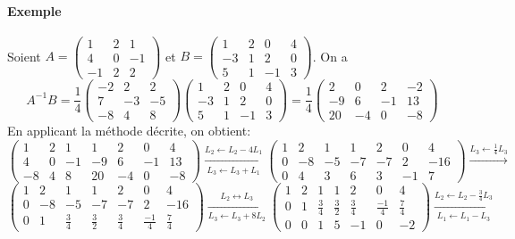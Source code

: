 \paragraph{Exemple} Soient $A=\begin{pmatrix}1&2&1\\4&0&-1\\-1&2&2\end{pmatrix}$ et $B=\begin{pmatrix}1&2&0&4\\-3&1&2&0\\5&1&-1&3\end{pmatrix}$.
On a
$$A^{-1}B=\frac{1}{4}\begin{pmatrix}-2&2&2\\7&-3&-5\\-8&4&8\end{pmatrix}\begin{pmatrix}1&2&0&4\\-3&1&2&0\\5&1&-1&3\end{pmatrix}= \frac{1}{4}\begin{pmatrix}2&0&2&-2\\-9&6&-1&13\\20&-4&0&-8\end{pmatrix}$$
En applicant la méthode décrite, on obtient:
$$
\left( \begin{array}{ccc|cccc}
1&2&1&	1&2&0&4 \\ 
4&0&-1&	-9&6&-1&13 \\
-8&4&8&	20&-4&0&-8
\end{array}\right)
\xrightarrow[L_3\leftarrow L_3+L_1]{L_2\leftarrow L_2-4L_1}
\left( \begin{array}{ccc|cccc}
1&2&1&	1&2&0&4 \\ 
0&-8&-5&	-7&-7&2&-16 \\
0&4&3&	6&3&-1&7
\end{array}\right)
\xrightarrow{L_3\leftarrow \frac{1}{4}L_3}$$
$$\left( \begin{array}{ccc|cccc}
1&2&1&	1&2&0&4 \\ 
0&-8&-5&	-7&-7&2&-16 \\
0&1&\frac{3}{4}&	\frac{3}{2}&\frac{3}{4}&\frac{-1}{4}&\frac{7}{4}
\end{array}\right)
\xrightarrow[L_3\leftarrow L_3+8L_2]{L_2\leftrightarrow L_3}
\left( \begin{array}{ccc|cccc}
1&2&1&	1&2&0&4 \\ 
0&1&\frac{3}{4}&	\frac{3}{2}&\frac{3}{4}&\frac{-1}{4}&\frac{7}{4} \\
0&0&1&	5&-1&0&-2
\end{array}\right)
\xrightarrow[L_1\leftarrow L_1-L_3]{L_2\leftarrow L_2-\frac{3}{4}L_3}$$
